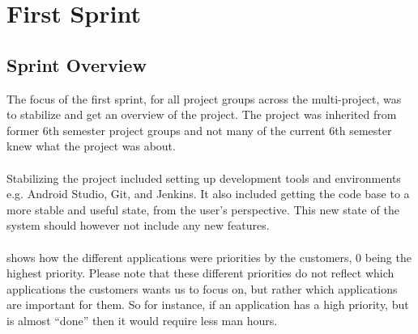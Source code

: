 \part{First Sprint}
\label{par:first_sprint}

\chapter{Sprint Overview}
The focus of the first sprint, for all project groups across the multi-project, was to stabilize and get an overview of the project. The project was inherited from former 6th semester project groups and not many of the current 6th semester knew what the \giraf project was about.
\\\\
Stabilizing the project included setting up development tools and environments e.g. Android Studio, Git, and Jenkins. It also included getting the code base to a more stable and useful state, from the user's perspective. This new state of the system should however not include any new features.
\\\\
 shows how the different applications were priorities by the customers, 0 being the highest priority. Please note that these different priorities do not reflect which applications the customers wants us to focus on, but rather which applications are important for them. So for instance, if an application has a high priority, but is almost ``done'' then it would require less man hours.

